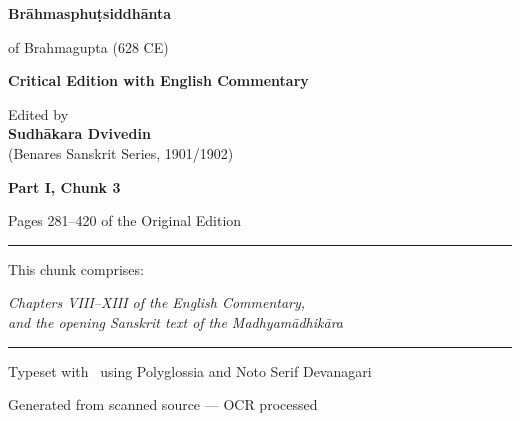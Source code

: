 \documentclass[11pt,a4paper]{article}
\newcommand{\shortline}{\noindent\rule{0.5\textwidth}{0.4pt}\par}
\theoremstyle{definition}
\begin{document}
\begin{titlepage}
\centering
\vspace*{2cm}

{\Huge\bfseries\color{titlecolor} Br\=ahmasphu\d{t}siddh\=anta}

\vspace{0.5cm}
{\Large\color{sectioncolor} of Brahmagupta (628 CE)}

\vspace{2cm}
{\LARGE\bfseries Critical Edition with English Commentary}

\vspace{1.5cm}
{\Large Edited by\\[0.3cm]
\textbf{Sudh\=akara Dvivedin}\\[0.2cm]
(Benares Sanskrit Series, 1901/1902)}

\vspace{2cm}
{\Large\bfseries\color{sectioncolor} Part I, Chunk 3}

\vspace{0.5cm}
{\large Pages 281--420 of the Original Edition}

\vspace{1cm}
\shortline

\vspace{0.5cm}
{\normalsize This chunk comprises:}

\vspace{0.3cm}
\begin{minipage}{0.8\textwidth}
\centering
\textit{Chapters VIII--XIII of the English Commentary,}\\[0.2cm]
\textit{and the opening Sanskrit text of the Madhyam\=adhik\=ara}
\end{minipage}

\vspace{1cm}
\shortline

\vspace{0.5cm}
{\small Typeset with \XeLaTeX\ using Polyglossia and Noto Serif Devanagari}

\vfill
{\small Generated from scanned source --- OCR processed}

\end{titlepage}

\tableofcontents
\newpage
\end{document}
